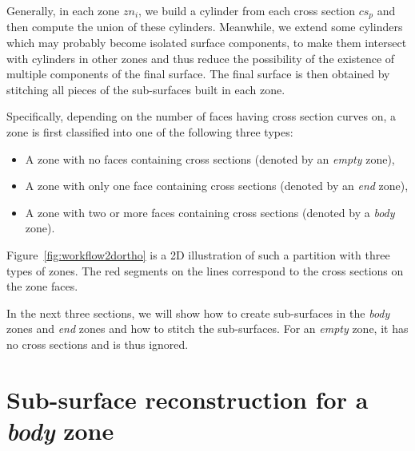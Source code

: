 Generally, in each zone $zn_i$, we build a cylinder from  each cross
section $cs_p$ and then compute the union of these cylinders.
Meanwhile, we extend some cylinders which may probably become
isolated surface components, to make them intersect with cylinders
in other zones and thus reduce the possibility of the existence of
multiple components of the final surface. The final surface is then
obtained by stitching all pieces of the sub-surfaces built in each
zone.

Specifically, depending on the number of faces  having cross section
curves on, a zone is first classified into one of the following
three types:
\begin{itemize}
    \item A zone with no faces containing cross sections (denoted by an \textit{empty} zone),
    \item A zone with only one face containing cross sections (denoted by an \textit{end} zone),
    \item A zone with two or more faces containing cross sections (denoted by a \textit{body} zone).
\end{itemize}
Figure~\ref{fig:workflow2dortho} is a 2D illustration of such a
partition with three types of zones. The red segments on the lines
correspond to the cross sections on the zone faces.


In the next three sections, we will show how to create sub-surfaces in
the \textit{body} zones and \textit{end} zones and how to stitch
the sub-surfaces. For an \textit{empty} zone, it has no cross
sections and is thus ignored.




\section{Sub-surface reconstruction for a \textit{body} zone}
\label{ch4:sec:algo:body}

